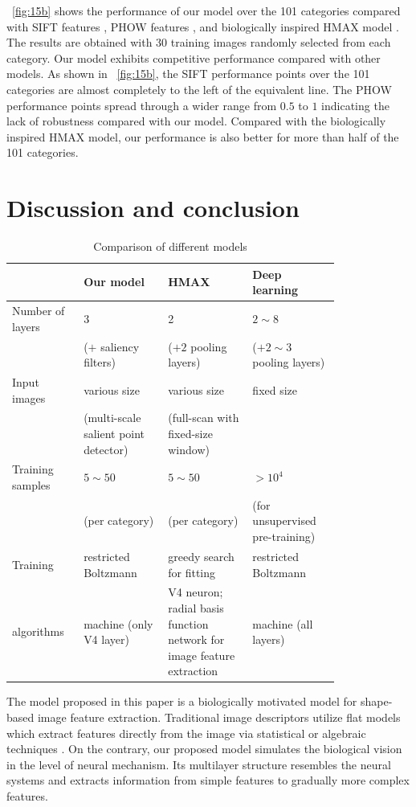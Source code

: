 \documentclass[twocolumn]{article}
\begin{document}
\figurename~\ref{fig:15b} shows the performance of our model over the 101 categories
compared with SIFT features \cite{lowe1999}, PHOW features \cite{lazebnik2006}, and biologically inspired HMAX model \cite{cadieu2007}.
The results are obtained with 30 training images randomly selected from each category.
Our model exhibits competitive performance compared with other models.
As shown in \figurename~\ref{fig:15b}, the SIFT performance points over the 101 categories are almost completely to the left of the equivalent line.
The PHOW performance points spread through a wider range from $0.5$ to $1$ indicating the lack of robustness compared with our model.
Compared with the biologically inspired HMAX model, our performance is also better for more than half of the 101 categories.

\section{Discussion and conclusion}\label{sec:5}

\begin{table}[!t]
\caption{Comparison of different models}
\centering
\small
\begin{tabular}{|p{0.15\linewidth}|p{0.22\linewidth}|p{0.22\linewidth}|p{0.22\linewidth}|}
\hline
& Our model & HMAX & Deep learning \\\hline
Number of layers & 3 & 2 & $2\sim8$ \\
& ($+$ saliency filters) & ($+2$ pooling layers) & ($+2\sim3$ pooling layers)\\\hline
Input images & various size & various size & fixed size \\
& (multi-scale salient point detector) & (full-scan with fixed-size window) & \\\hline
Training samples & $5\sim50$ & $5\sim50$ & $>10^4$ \\
& (per category) & (per category) & (for unsupervised pre-training) \\\hline
Training & restricted Boltzmann & greedy search for fitting & restricted Boltzmann \\
algorithms & machine (only V4 layer) & V4 neuron; radial basis function network for image feature extraction & machine (all layers) \\\hline
\end{tabular}
\label{tab:2}
\end{table}

The model proposed in this paper is a biologically motivated model for shape-based image feature extraction.
Traditional image descriptors utilize flat models which extract features directly from the image via statistical or algebraic techniques \cite{mikolajczyk2005}. 
On the contrary, our proposed model simulates the biological vision in the level of neural mechanism.
Its multilayer structure resembles the neural systems and extracts information from simple features to gradually more complex features. 
\end{document}
